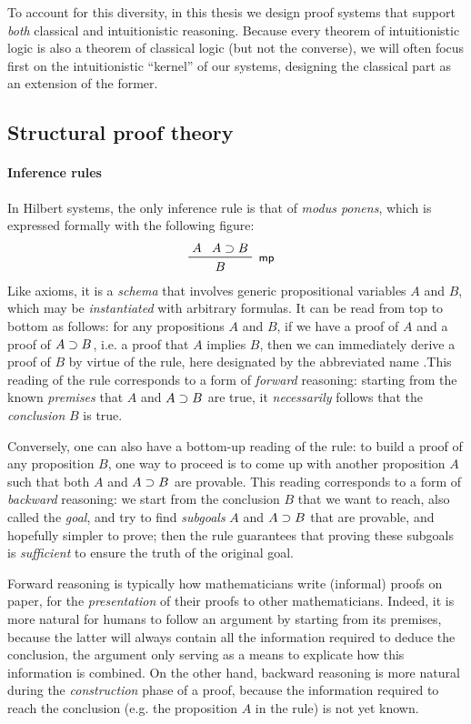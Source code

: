 \begin{emphpar}
To account for this diversity, in this thesis we design proof systems that
support \emph{both} classical and intuitionistic reasoning. Because every
theorem of intuitionistic logic is also a theorem of classical logic (but not
the converse), we will often focus first on the intuitionistic ``kernel'' of our
systems, designing the classical part as an extension of the former.
\end{emphpar}

\subsection{Structural proof theory}

\paragraph{Inference rules}

In Hilbert systems, the only inference rule is that of \emph{modus ponens},
which is expressed formally with the following figure:
$$\R[\rsf{mp}]{A}{A \limp B}{B}$$
Like axioms, it is a \emph{schema} that involves generic propositional variables
$A$ and $B$, which may be \emph{instantiated} with arbitrary formulas. It can be
read from top to bottom as follows: for any propositions $A$ and $B$, if we have
a proof of $A$ and a proof of $A \supset B$, i.e. a proof that $A$ implies $B$,
then we can immediately derive a proof of $B$ by virtue of the rule, here
designated by the abbreviated name .This reading of the rule
corresponds to a form of \emph{forward} reasoning: starting from the known
\emph{premises} that $A$ and $A \supset B$ are true, it \emph{necessarily} follows
that the \emph{conclusion} $B$ is true.

Conversely, one can also have a bottom-up reading of the rule: to build a proof
of any proposition $B$, one way to proceed is to come up with another
proposition $A$ such that both $A$ and $A \supset B$ are provable. This reading
corresponds to a form of \emph{backward} reasoning: we start from the conclusion
$B$ that we want to reach, also called the \emph{goal}, and try to find
\emph{subgoals} $A$ and $A \supset B$ that are provable, and hopefully simpler to
prove; then the rule guarantees that proving these subgoals is \emph{sufficient}
to ensure the truth of the original goal.

Forward reasoning is typically how mathematicians write (informal) proofs on
paper, for the \emph{presentation} of their proofs to other mathematicians.
Indeed, it is more natural for humans to follow an argument by starting from its
premises, because the latter will always contain all the information required to
deduce the conclusion, the argument only serving as a means to explicate how
this information is combined. On the other hand, backward reasoning is more
natural during the \emph{construction} phase of a proof, because the information
required to reach the conclusion (e.g. the proposition $A$ in the  rule)
is not yet known.

